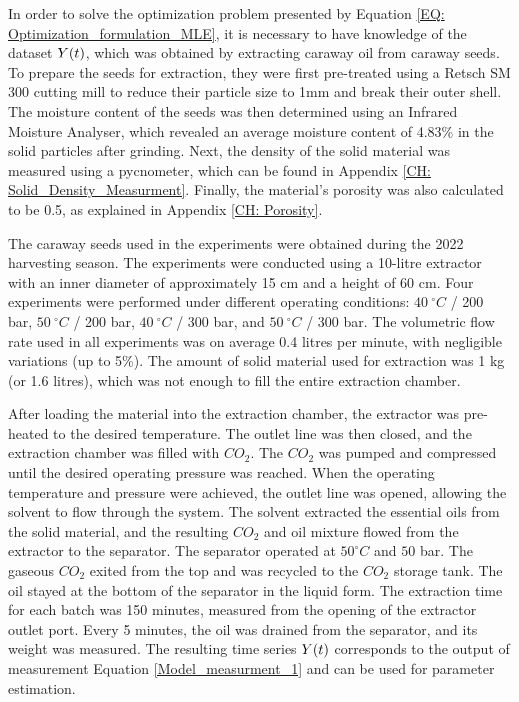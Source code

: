 \documentclass[../Article_Model_Parameters.tex]{subfiles}
\begin{document}
	
	\label{CH: Experiments}
	
	In order to solve the optimization problem presented by Equation \ref{EQ: Optimization_formulation_MLE}, it is necessary to have knowledge of the dataset ${\color{black}Y}(t)$, which was obtained by extracting caraway oil from caraway seeds. To prepare the seeds for extraction, they were first pre-treated using a Retsch SM 300 cutting mill to reduce their particle size to 1mm and break their outer shell. The moisture content of the seeds was then determined using an Infrared Moisture Analyser, which revealed an average moisture content of 4.83\% in the solid particles after grinding. Next, the density of the solid material was measured using a pycnometer, which can be found in Appendix \ref{CH: Solid_Density_Measurment}. Finally, the material's porosity was also calculated to be 0.5, as explained in Appendix \ref{CH: Porosity}.
	
	The caraway seeds used in the experiments were obtained during the 2022 harvesting season. The experiments were conducted using a 10-litre extractor with an inner diameter of approximately 15 cm and a height of 60 cm. Four experiments were performed under different operating conditions: $40~^\circ C$ / 200 bar, $50~^\circ C$ / 200 bar, $40~^\circ C$ / 300 bar, and $50~^\circ C$ / 300 bar. The volumetric flow rate used in all experiments was on average 0.4 litres per minute, with negligible variations (up to 5\%). The amount of solid material used for extraction was 1 kg (or 1.6 litres), which was not enough to fill the entire extraction chamber.
	
	After loading the material into the extraction chamber, the extractor was pre-heated to the desired temperature. The outlet line was then closed, and the extraction chamber was filled with $CO_2$. The $CO_2$ was pumped and compressed until the desired operating pressure was reached. When the operating temperature and pressure were achieved, the outlet line was opened, allowing the solvent to flow through the system. The solvent extracted the essential oils from the solid material, and the resulting $CO_2$ and oil mixture flowed from the extractor to the separator. The separator operated at $50^\circ C$ and $50$ bar. The gaseous $CO_2$ exited from the top and was recycled to the $CO_2$ storage tank. The oil stayed at the bottom of the separator in the liquid form. The extraction time for each batch was 150 minutes, measured from the opening of the extractor outlet port. Every 5 minutes, the oil was drained from the separator, and its weight was measured. The resulting time series ${\color{black}Y}(t)$ corresponds to the output of measurement Equation \ref{Model_measurment_1} and can be used for parameter estimation.
	
\end{document}
